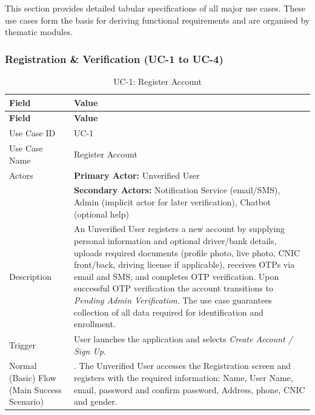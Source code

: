 This section provides detailed tabular specifications of all major use cases. These use cases form the basis for deriving functional requirements and are organised by thematic modules.

\subsubsection{Registration \& Verification (UC-1 to UC-4)}

\begin{longtable}{|>{\raggedright\arraybackslash}p{4cm}|>{\raggedright\arraybackslash}p{11cm}|}
\caption{UC-1: Register Account}
\label{tab:uc-1} \\
\hline
\rowcolor{lightgray!30}
\textbf{Field} & \textbf{Value} \\
\hline
\endfirsthead
\hline
\rowcolor{lightgray!30}
\textbf{Field} & \textbf{Value} \\
\hline
\endhead
\hline
\endfoot
\hline
\endlastfoot
Use Case ID & UC-1 \\
\hline
Use Case Name & Register Account \\
\hline
Actors & \textbf{Primary Actor:} Unverified User \\
& \textbf{Secondary Actors:} Notification Service (email/SMS), Admin (implicit actor for later verification), Chatbot (optional help) \\
\hline
Description & An Unverified User registers a new account by supplying personal information and optional driver/bank details, uploads required documents (profile photo, live photo, CNIC front/back, driving license if applicable), receives OTPs via email and SMS, and completes OTP verification. Upon successful OTP verification the account transitions to \textit{Pending Admin Verification}. The use case guarantees collection of all data required for identification and enrollment. \\
\hline
Trigger & User launches the application and selects \textit{Create Account / Sign Up}. \\
\hline
Normal (Basic) Flow (Main Success Scenario) & 1. The Unverified User accesses the Registration screen and registers with the required information: Name, User Name, email, password and confirm password, Address, phone, CNIC and gender. \\

\end{longtable}
